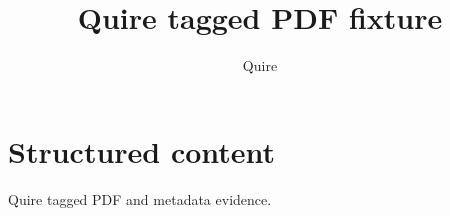 \documentclass{article}
\title{Quire tagged PDF fixture}
\author{Quire}
\begin{document}
\maketitle
\section{Structured content}
Quire tagged PDF and metadata evidence.
\end{document}
